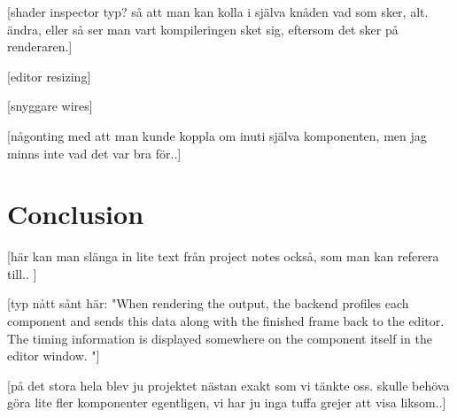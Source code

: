 [shader inspector typ? så att man kan kolla i själva knåden vad som sker, alt. ändra, eller så ser man vart kompileringen sket sig, eftersom det sker på renderaren.]

[editor resizing]

[snyggare wires]

[någonting med att man kunde koppla om inuti själva komponenten, men jag minns inte vad det var bra för..]

\chapter{Conclusion}

[här kan man slänga in lite text från project notes också, som man kan referera till.. ]

[typ nått sånt här: "When rendering the output, the backend profiles each component and sends this data along with the finished frame back to the editor. The timing information is displayed somewhere on the component itself in the editor window. "]

[på det stora hela blev ju projektet nästan exakt som vi tänkte oss. skulle behöva göra lite fler komponenter egentligen, vi har ju inga tuffa grejer att visa liksom..]